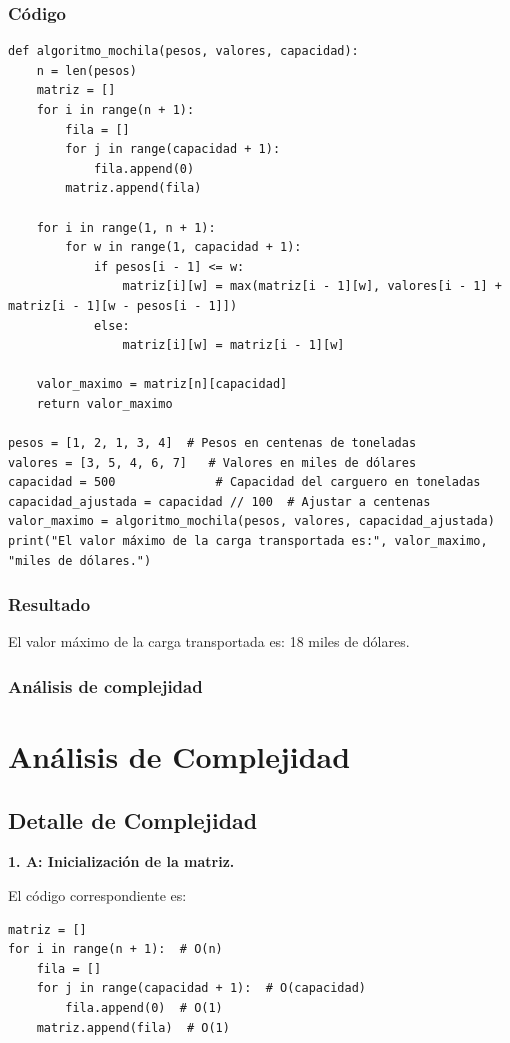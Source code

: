 \subsubsection{Código}
\begin{lstlisting}
def algoritmo_mochila(pesos, valores, capacidad):
    n = len(pesos)  
    matriz = []
    for i in range(n + 1):
        fila = []
        for j in range(capacidad + 1):
            fila.append(0)  
        matriz.append(fila)  

    for i in range(1, n + 1):  
        for w in range(1, capacidad + 1):  
            if pesos[i - 1] <= w:  
                matriz[i][w] = max(matriz[i - 1][w], valores[i - 1] + matriz[i - 1][w - pesos[i - 1]])  
            else:
                matriz[i][w] = matriz[i - 1][w]  

    valor_maximo = matriz[n][capacidad]
    return valor_maximo

pesos = [1, 2, 1, 3, 4]  # Pesos en centenas de toneladas
valores = [3, 5, 4, 6, 7]   # Valores en miles de dólares
capacidad = 500              # Capacidad del carguero en toneladas
capacidad_ajustada = capacidad // 100  # Ajustar a centenas
valor_maximo = algoritmo_mochila(pesos, valores, capacidad_ajustada)
print("El valor máximo de la carga transportada es:", valor_maximo, "miles de dólares.")
\end{lstlisting}

\subsubsection{Resultado}
El valor máximo de la carga transportada es: 18 miles de dólares.

\subsubsection{Análisis de complejidad}

\section*{Análisis de Complejidad}

\subsection*{Detalle de Complejidad}

\textbf{1. A: Inicialización de la matriz.}

El código correspondiente es:
\begin{lstlisting}
matriz = []
for i in range(n + 1):  # O(n)
    fila = []
    for j in range(capacidad + 1):  # O(capacidad)
        fila.append(0)  # O(1)
    matriz.append(fila)  # O(1)
\end{lstlisting}


